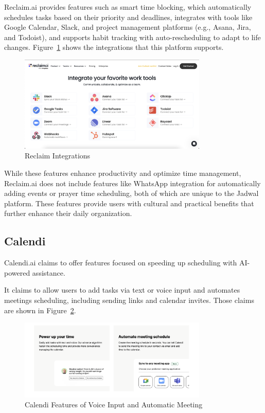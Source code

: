 \documentclass[12pt,a4paper]{report}
\begin{document}
Reclaim.ai provides features such as smart time blocking, which automatically schedules tasks based on their priority and deadlines, integrates with tools like Google Calendar, Slack, and project management platforms (e.g., Asana, Jira, and Todoist), and supports habit tracking with auto-rescheduling to adapt to life changes. Figure~\ref{fig:reclaim-integrations} shows the integrations that this platform supports.

\begin{figure}[!h]
    \centering
    \includegraphics[width=0.8\textwidth]{images/competitors/reclaim-integrations.png}
    \caption{Reclaim Integrations}
    \label{fig:reclaim-integrations}
\end{figure}

While these features enhance productivity and optimize time management, Reclaim.ai does not include features like WhatsApp integration for automatically adding events or prayer time scheduling, both of which are unique to the Jadwal platform. These features provide users with cultural and practical benefits that further enhance their daily organization.

\subsection{Calendi}

Calendi.ai claims to offer features focused on speeding up scheduling with AI-powered assistance.

It claims to allow users to add tasks via text or voice input and automates meetings scheduling, including sending links and calendar invites.
Those claims are shown in Figure~\ref{fig:calendi-feature-voice-input}.

\begin{figure}[!h]
    \centering
    \includegraphics[width=0.8\textwidth]{images/competitors/calendi-feature-voice-input.png}
    \caption{Calendi Features of Voice Input and Automatic Meeting}
    \label{fig:calendi-feature-voice-input}
\end{figure}
\end{document}
